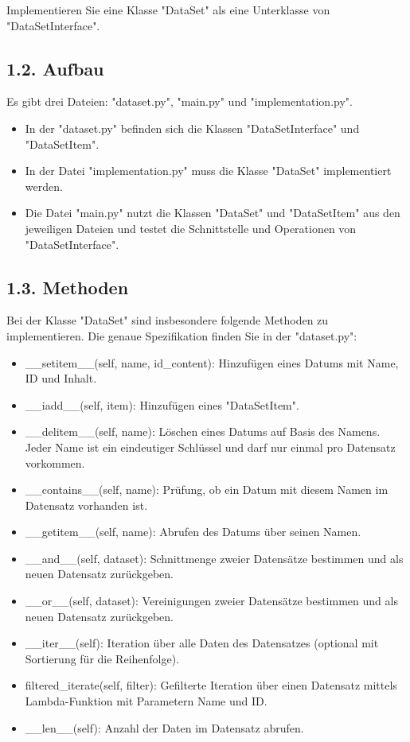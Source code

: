 \documentclass[a4paper,12pt]{article}
\begin{document}
Implementieren Sie eine Klasse "DataSet" als eine Unterklasse von "DataSetInterface".

\subsection{1.2. Aufbau}
\justify
Es gibt drei Dateien: "dataset.py", "main.py" und "implementation.py".
\begin{itemize}
    \item In der "dataset.py" befinden sich die Klassen "DataSetInterface" und "DataSetItem".
    \item In der Datei "implementation.py" muss die Klasse "DataSet" implementiert werden.
    \item Die Datei "main.py" nutzt die Klassen "DataSet" und "DataSetItem" aus den jeweiligen Dateien und testet die Schnittstelle und Operationen von "DataSetInterface".
\end{itemize}

\subsection{1.3. Methoden}
\justify
Bei der Klasse "DataSet" sind insbesondere folgende Methoden zu implementieren. Die genaue Spezifikation finden Sie in der "dataset.py":
\begin{itemize}
    \item \_\_setitem\_\_(self, name, id\_content): Hinzuf\"ugen eines Datums mit Name, ID und Inhalt.
    \item \_\_iadd\_\_(self, item): Hinzuf\"ugen eines "DataSetItem".
    \item \_\_delitem\_\_(self, name): L\"oschen eines Datums auf Basis des Namens. Jeder Name ist ein eindeutiger Schl\"ussel und darf nur einmal pro Datensatz vorkommen.
    \item \_\_contains\_\_(self, name): Pr\"ufung, ob ein Datum mit diesem Namen im Datensatz vorhanden ist.
    \item \_\_getitem\_\_(self, name): Abrufen des Datums \"uber seinen Namen.
    \item \_\_and\_\_(self, dataset): Schnittmenge zweier Datens\"atze bestimmen und als neuen Datensatz zur\"uckgeben.
    \item \_\_or\_\_(self, dataset): Vereinigungen zweier Datens\"atze bestimmen und als neuen Datensatz zur\"uckgeben.
    \item \_\_iter\_\_(self): Iteration \"uber alle Daten des Datensatzes (optional mit Sortierung f\"ur die Reihenfolge).
    \item filtered\_iterate(self, filter): Gefilterte Iteration \"uber einen Datensatz mittels Lambda-Funktion mit Parametern Name und ID.
    \item \_\_len\_\_(self): Anzahl der Daten im Datensatz abrufen.
\end{itemize}
\end{document}
